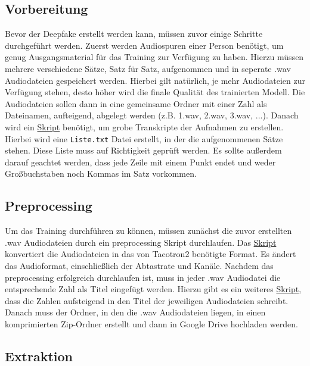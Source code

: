 \subsection{Vorbereitung}
Bevor der Deepfake erstellt werden kann, müssen zuvor einige Schritte durchgeführt werden. Zuerst werden Audiospuren einer Person benötigt, um genug Ausgangsmaterial für das Training zur Verfügung zu haben. Hierzu müssen mehrere verschiedene Sätze, Satz für Satz, aufgenommen und in seperate .wav Audiodateien gespeichert werden. Hierbei gilt natürlich, je mehr Audiodateien zur Verfügung stehen, desto höher wird die finale Qualität des trainierten Modell. Die Audiodateien sollen dann in eine gemeinsame Ordner mit einer Zahl als Dateinamen, aufteigend, abgelegt werden (z.B. 1.wav, 2.wav, 3.wav, ...).\newline
Danach wird ein \href{https://github.com/rasmurtech/Tacotron2-Wav2Vec-Transcription/blob/main/transcribe_wav2vec.py}{Skript} benötigt, um grobe Transkripte der Aufnahmen zu erstellen. Hierbei wird eine \texttt{Liste.txt} Datei erstellt, in der die aufgenommenen Sätze stehen. Diese Liste muss auf Richtigkeit geprüft werden. Es sollte außerdem darauf geachtet werden, dass jede Zeile mit einem Punkt endet und weder Großbuchstaben noch Kommas im Satz vorkommen.\newline
\subsection{Preprocessing}
Um das Training durchführen zu können, müssen zunächst die zuvor erstellten .wav Audiodateien durch ein preprocessing Skript durchlaufen. Das \href{https://github.com/rasmurtech/Tacotron-2-Audio-Preprocessor/blob/main/tacotron2_preprocessor_wav_files.py}{Skript} konvertiert die Audiodateien in das von Tacotron2 benötigte Format. Es ändert das Audioformat, einschließlich der Abtastrate und Kanäle.\newline
Nachdem das preprocessing erfolgreich durchlaufen ist, muss in jeder .wav Audiodatei die entsprechende Zahl als Titel eingefügt werden. Hierzu gibt es ein weiteres \href{https://github.com/rasmurtech/Audio-Metadata-Updater/blob/main/audio_metadata_updater.py}{Skript}, dass die Zahlen aufsteigend in den Titel der jeweiligen Audiodateien schreibt.\newline
Danach muss der Ordner, in den die .wav Audiodateien liegen, in einen komprimierten Zip-Ordner erstellt und dann in Google Drive hochladen werden.
\subsection{Extraktion}
